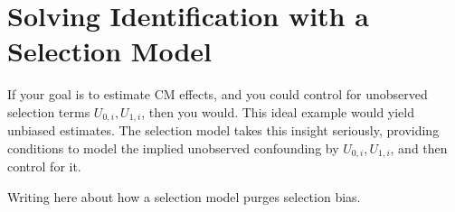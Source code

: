 \section{Solving Identification with a Selection Model}
\label{sec:selectionmodel}
If your goal is to estimate CM effects, and you could control for unobserved selection terms $U_{0,i}, U_{1,i}$, then you would.
This ideal example would yield unbiased estimates.
The selection model takes this insight seriously, providing conditions to model the implied unobserved confounding by $U_{0,i}, U_{1,i}$, and then control for it.

Writing here about how a \cite{heckman1974shadow} selection model purges selection bias.
